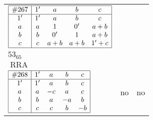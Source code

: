 \documentclass[12pt]{article}
\newcommand\RRA{\operatorname{RRA}}
\newcommand{\join}{\mathbin{+}}%
\newcommand{\id}{{1'}}%
\renewcommand{\div}{0'}
\renewcommand{\top}{1}%
\begin{document}
\begin{center}
\begin{longtable}{l|c|c}
$
\begin{array}{|c|cccc|} \hline
\#267 & \id & a & b & c \\ \hline
\id & \id & a & b & c \\
a & a & \top & \div & a \join b \\
b & b & \div & \top & a \join b \\
c & c & a \join b & a \join b & \id \join c \\ \hline
\end{array}
$
 & \begin{tabular}{c} yes \\ $53_{65}$ \\ $\RRA$ \end{tabular} 
 & \adjustbox{valign=c, max height=1.6cm}{$
\left[ \begin{array}{cccccc}
\id & a & a & b & c & c \\ 
a & \id & a & a & a & b \\ 
a & a & \id & b & b & b \\ 
b & a & b & \id & b & b \\ 
c & a & b & b & \id & c \\ 
c & b & b & b & c & \id
\end{array}\right]
$}      \\[15mm]

$
\begin{array}{|c|cccc|} \hline
\#268 & \id & a & b & c \\ \hline
\id & \id & a & b & c \\
a & a & -c & a & c \\
b & b & a & -a & b \\
c & c & c & b & -b \\ \hline
\end{array}
$
 & no  
 & no       \\[15mm]


\end{longtable}
\end{center}
\end{document}
